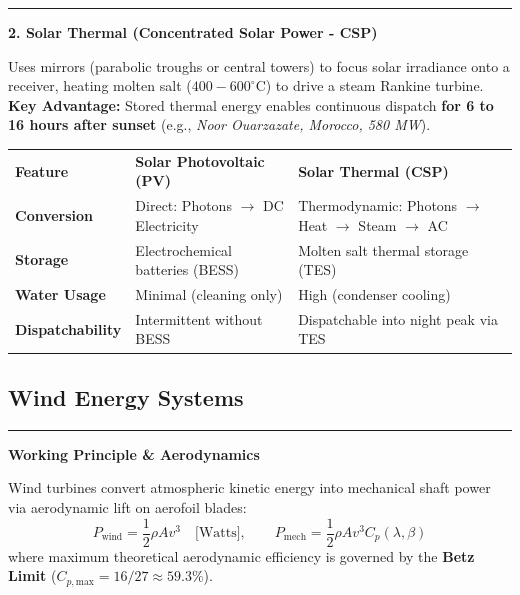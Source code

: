 \documentclass[11pt,a4paper]{article}
\newcommand{\concept}[1]{%
  \vspace{3pt}\noindent\textcolor{AnthGreen}{\rule{3.5pt}{10pt}}\enspace
  \textbf{\sffamily\color{AnthDark}#1}\par\vspace{2pt}%
}
\newenvironment{Note}[1][Note]{\begin{tcolorbox}[notebox, title=#1]}{\end{tcolorbox}}
\begin{document}
\concept{2. Solar Thermal (Concentrated Solar Power - CSP)}
Uses mirrors (parabolic troughs or central towers) to focus solar irradiance onto a receiver, heating molten salt ($400-600^\circ\text{C}$) to drive a steam Rankine turbine. \textbf{Key Advantage:} Stored thermal energy enables continuous dispatch \textbf{for 6 to 16 hours after sunset} (e.g., \emph{Noor Ouarzazate, Morocco, 580 MW}).

\begin{Note}[Comparison: Solar PV vs. Solar Thermal (CSP)]
\begin{center}
\small
\begin{tabularx}{\linewidth}{L{3.0cm} X X}
  \color{white}\textbf{Feature} & \color{white}\textbf{Solar Photovoltaic (PV)} & \color{white}\textbf{Solar Thermal (CSP)} \\
   \textbf{Conversion} & Direct: Photons $\to$ DC Electricity & Thermodynamic: Photons $\to$ Heat $\to$ Steam $\to$ AC \\
  \textbf{Storage} & Electrochemical batteries (BESS) & Molten salt thermal storage (TES) \\
   \textbf{Water Usage} & Minimal (cleaning only) & High (condenser cooling) \\
  \textbf{Dispatchability} & Intermittent without BESS & Dispatchable into night peak via TES \\
\end{tabularx}
\end{center}
\end{Note}

\subsection{Wind Energy Systems}

\concept{Working Principle \& Aerodynamics}
Wind turbines convert atmospheric kinetic energy into mechanical shaft power via aerodynamic lift on aerofoil blades:
\begin{equation}
  P_{\text{wind}} = \frac{1}{2} \rho A v^3 \quad \text{[Watts]}, \qquad P_{\text{mech}} = \frac{1}{2} \rho A v^3 C_p(\lambda, \beta)
\end{equation}
where maximum theoretical aerodynamic efficiency is governed by the \textbf{Betz Limit} ($C_{p,\text{max}} = 16/27 \approx 59.3\%$).
\end{document}
